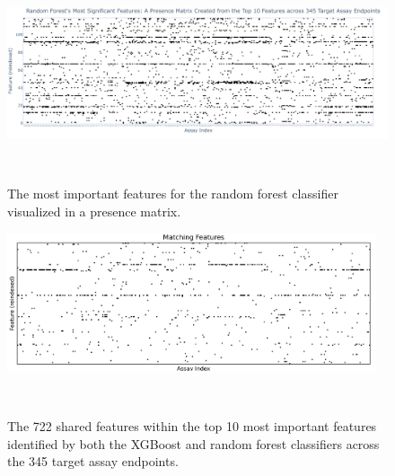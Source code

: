 \begin{figure}[h]
  \centering
  \includegraphics[width=1.0\textwidth]{figures/Feature_Selection_RandomForestClassifier__Feature_Selection_RandomForestClassifier_feature_importance.png}  
  \caption{The most important features for the random forest classifier visualized in a presence matrix.}
~\label{fig:Feature_Selection_RandomForestClassifier__Feature_Selection_RandomForestClassifier_feature_importance} 
\end{figure}

\begin{figure}[h]
  \centering
  \includegraphics[width=0.97\textwidth]{figures/matching_features.png}  
  \caption{The 722 shared features within the top 10 most important features identified by both the XGBoost and random forest classifiers across the 345 target assay endpoints.}
~\label{fig:matching_features} 
\end{figure}







